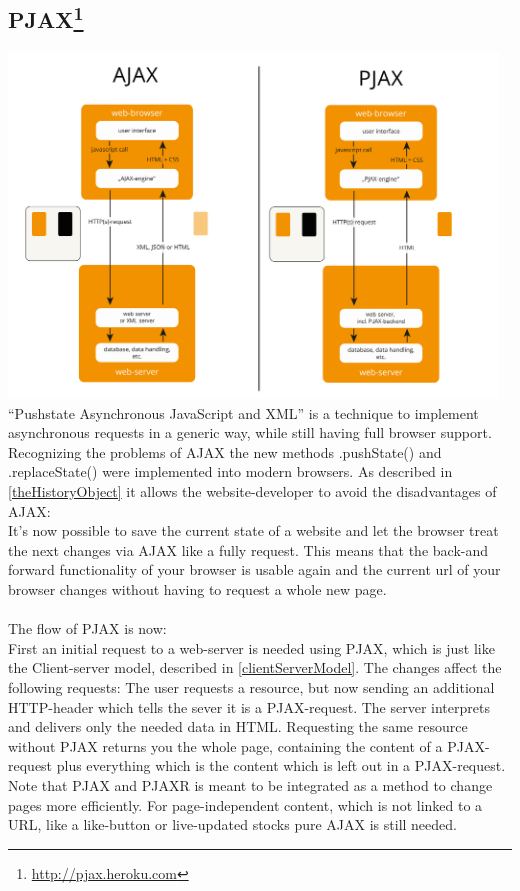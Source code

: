 \documentclass[f,bachelor,binding,twoside,palatino]{WeSTthesis}
\def \ajax {AJAX}
\def \pjax {PJAX}
\def \pjaxRequest {PJAX-request}
\def \pjaxr {PJAXR}
\begin{document}
  
  \subsection[\pjax]{\pjax\footnote{\url{http://pjax.heroku.com}}\label{pjax}}
	\includegraphics[width=13cm]{images/ajax_vs_pjax}\\
	\enquote{Pushstate Asynchronous JavaScript and XML} is a technique to implement asynchronous requests in a generic way, while still having full browser support.
    Recognizing the problems of \ajax{} the new methods .pushState() and .replaceState() were implemented into modern browsers.
    As described in \ref{theHistoryObject} it allows the website-developer to avoid the disadvantages of \ajax{}:\\
    It's now possible to save the current state of a website and let the browser treat the next changes via \ajax{} like a fully request.
    This means that the back-and forward functionality of your browser is usable again and the current url of your browser changes without having to request a whole new page.\\\\
    The flow of \pjax{} is now:\\
    First an initial request to a web-server is needed using \pjax{}, which is just like the Client-server model, described in \ref{clientServerModel}.
    The changes affect the following requests: 
    The user requests a resource, but now sending an additional HTTP-header which tells the sever it is a \pjaxRequest{}.
    The server interprets and delivers only the needed data in HTML.
    Requesting the same resource without \pjax{} returns you the whole page, containing the content of a \pjaxRequest{} plus everything which is the content which is left out in a \pjaxRequest{}.
    Note that \pjax{} and \pjaxr{} is meant to be integrated as a method to change pages more efficiently.
    For page-independent content, which is not linked to a URL, like a like-button or live-updated stocks pure \ajax{} is still needed.
\end{document}
